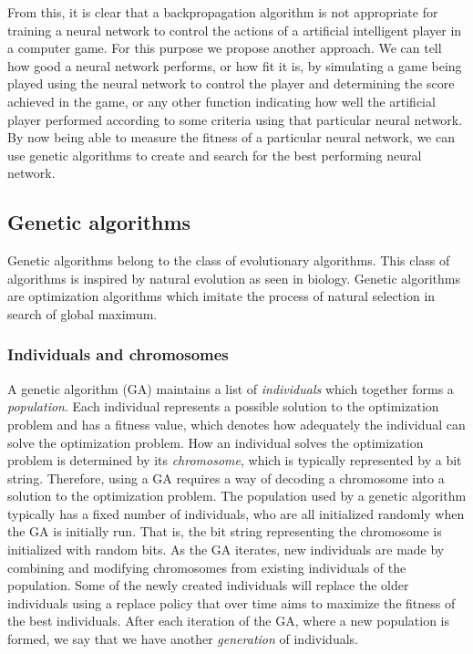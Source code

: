 From this, it is clear that a backpropagation algorithm is not appropriate for training a neural network to control the actions of a artificial intelligent player in a computer game. For this purpose we propose another approach. We can tell how good a neural network performs, or how fit it is, by simulating a game being played using the neural network to control the player and determining the score achieved in the game, or any other function indicating how well the artificial player performed according to some criteria using that particular neural network. By now being able to measure the fitness of a particular neural network, we can use genetic algorithms to create and search for the best performing neural network.

\subsection{Genetic algorithms}
Genetic algorithms belong to the class of evolutionary algorithms. This class of algorithms is inspired by natural evolution as seen in biology. Genetic algorithms are optimization algorithms which imitate the process of natural selection in search of global maximum.

\subsubsection{Individuals and chromosomes}
A genetic algorithm (GA) maintains a list of \emph{individuals} which together forms a \emph{population}. Each individual represents a possible solution to the optimization problem and has a fitness value, which denotes how adequately the individual can solve the optimization problem. How an individual solves the optimization problem is determined by its \emph{chromosome}, which is typically represented by a bit string. Therefore, using a GA requires a way of decoding a chromosome into a solution to the optimization problem. The population used by a genetic algorithm typically has a fixed number of individuals, who are all initialized randomly when the GA is initially run. That is, the bit string representing the chromosome is initialized with random bits. As the GA iterates, new individuals are made by combining and modifying chromosomes from existing individuals of the population. Some of the newly created individuals will replace the older individuals using a replace policy that over time aims to maximize the fitness of the best individuals. After each iteration of the GA, where a new population is formed, we say that we have another \emph{generation} of individuals.

